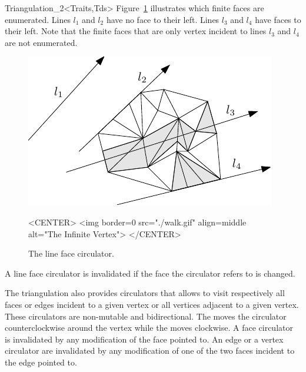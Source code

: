 \begin{ccRefClass}{Triangulation_2<Traits,Tds>}
Figure~\ref{Triangulation_ref_Fig_Line_face_circulator} illustrates which finite faces are enumerated. Lines
$l_1$ and $l_2$ have no face to their left. Lines $l_3$ and $l_4$
have faces to their left. Note that the finite faces that are only vertex
incident to lines $l_3$ and  $l_4$ are not enumerated.

\begin{figure}
\begin{ccTexOnly}
\begin{center}  \includegraphics{Triangulation_2/walk} \end{center}
\end{ccTexOnly} 


\begin{ccHtmlOnly}
<CENTER>
<img border=0 src="./walk.gif" align=middle alt="The Infinite Vertex">
</CENTER>
\end{ccHtmlOnly} 

\caption{The line face circulator.
\label{Triangulation_ref_Fig_Line_face_circulator}}
\end{figure}

A line face circulator is invalidated if the face the circulator refers
to is changed.

\ccThreeToTwo




The triangulation also provides circulators that allows to visit 
respectively all faces or edges incident to a given vertex
or all vertices adjacent to a given vertex.
These circulators are
non-mutable
and bidirectional.
 The  moves the circulator
counterclockwise around the vertex while
the  moves clockwise.
A face circulator is invalidated by any modification of the face pointed to.
An edge or a vertex circulator are invalidated by any modification
of one of the two faces incident to the edge pointed to.


\end{ccRefClass}
